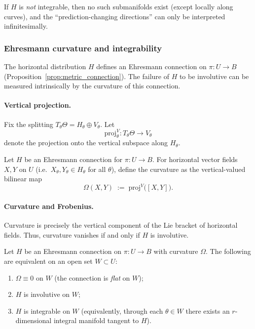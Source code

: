 If $H$ is \emph{not} integrable, then no such submanifolds exist (except locally along curves),
and the ``prediction-changing directions'' can only be interpreted infinitesimally.

\subsubsection{Ehresmann curvature and integrability}

The horizontal distribution $H$ defines an Ehresmann connection on $\pi:U\to B$
(Proposition~\ref{prop:metric_connection}).  The failure of $H$ to be involutive can be measured
intrinsically by the curvature of this connection.

\paragraph{Vertical projection.}
Fix the splitting $T_\theta\Theta = H_\theta \oplus V_\theta$.  Let
\[
\mathrm{proj}^V_\theta:T_\theta\Theta\to V_\theta
\]
denote the projection onto the vertical subspace along $H_\theta$.

\begin{gdefn}
\label{def:ehresmann_curvature}
Let $H$ be an Ehresmann connection for $\pi:U\to B$.
For horizontal vector fields $X,Y$ on $U$ (i.e.\ $X_\theta,Y_\theta\in H_\theta$ for all $\theta$),
define the curvature as the vertical-valued bilinear map
\[
\Omega(X,Y)
\;:=\;
\mathrm{proj}^V\bigl([X,Y]\bigr).
\]
\end{gdefn}

\paragraph{Curvature and Frobenius.}
Curvature is precisely the vertical component of the Lie bracket of horizontal fields.
Thus, curvature vanishes if and only if $H$ is involutive.

\begin{gprop}
\label{prop:flatness_integrability}
Let $H$ be an Ehresmann connection on $\pi:U\to B$ with curvature $\Omega$.
The following are equivalent on an open set $W\subset U$:
\begin{enumerate}\setlength{\itemsep}{2pt}
\item $\Omega\equiv 0$ on $W$ (the connection is \emph{flat} on $W$);
\item $H$ is involutive on $W$;
\item $H$ is integrable on $W$ (equivalently, through each $\theta\in W$ there exists an
$r$-dimensional integral manifold tangent to $H$).
\end{enumerate}
\end{gprop}

